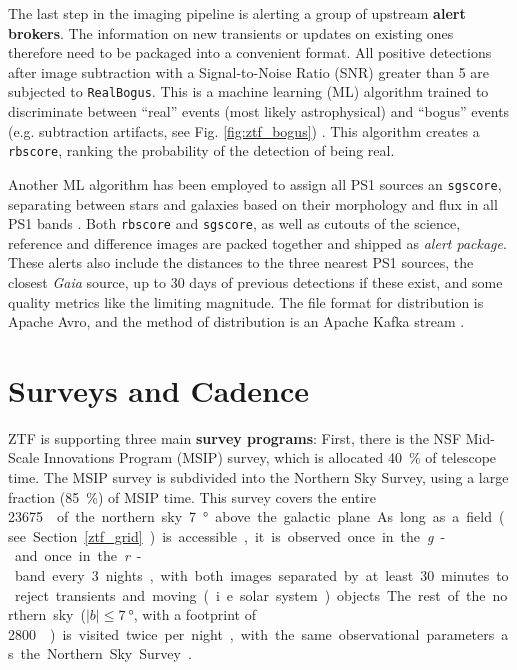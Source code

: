 The last step in the imaging pipeline is alerting a group of upstream \textbf{alert brokers}. The information on new transients or updates on existing ones therefore need to be packaged into a convenient format. All positive detections after image subtraction with a Signal-to-Noise Ratio (SNR) greater than 5 are subjected to \texttt{RealBogus}. This is a machine learning (ML) algorithm trained to discriminate between ``real'' events (most likely astrophysical) and ``bogus'' events (e.g. subtraction artifacts, see Fig. \ref{fig:ztf_bogus}) . This algorithm creates a \texttt{rbscore}, ranking the probability of the detection of being real.

Another ML algorithm has been employed to assign all PS1 sources an \texttt{sgscore}, separating between stars and galaxies based on their morphology and flux in all PS1 bands . Both \texttt{rbscore} and \texttt{sgscore}, as well as cutouts of the science, reference and difference images are packed together and shipped as \textit{alert package}. These alerts also include the distances to the three nearest PS1 sources, the closest \textit{Gaia} source, up to 30 days of previous detections if these exist, and some quality metrics like the limiting magnitude. The file format for distribution is Apache Avro, and the method of distribution is an Apache Kafka stream .

\section{Surveys and Cadence}
ZTF is supporting three main \textbf{survey programs}: First, there is the NSF Mid-Scale Innovations Program (MSIP) survey, which is allocated \SI{40}{\percent} of telescope time. The MSIP survey is subdivided into the Northern Sky Survey, using a large fraction (\SI{85}{\percent}) of MSIP time. This survey covers the entire \SI{23675}{\square\deg} of the northern sky \SI{7}{\degree} above the galactic plane. As long as a field (see Section \ref{ztf_grid}) is accessible, it is observed once in the \textit{g}- and once in the \textit{r}-band every 3 nights, with both images separated by at least 30 minutes to reject transients and moving (i.e. solar system) objects. The rest of the northern sky ($|b|\leq \SI{7}{\degree}$, with a footprint of \SI{2800}{\square\deg}) is visited twice per night, with the same observational parameters as the Northern Sky Survey \cite{Bellm2019a}.

